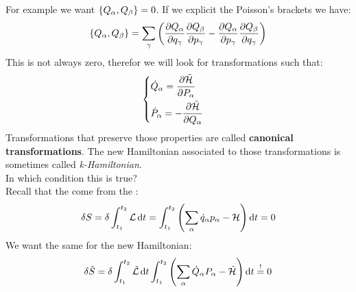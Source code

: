 For example we want $\pb{Q_{\alpha}}{Q_{\beta}} = 0$. If we explicit the Poisson's brackets we have:
\begin{equation}
    \pb{Q_{\alpha}}{Q_{\beta}} = \bigsum_{\gamma} \left(\pdv{Q_{\alpha}}{q_{\gamma}} \pdv{Q_{\beta}}{p_{\gamma}} - \pdv{Q_{\alpha}}{p_{\gamma}} \pdv{Q_{\beta}}{q_{\gamma}} \right)
\end{equation}
This is not always zero, therefor we will look for transformations such that:
\begin{equation}
    \begin{cases}
        \dot{Q}_{\alpha} = \pdv{\tilde{\hamfun}}{P_{\alpha}} \\[8pt]
        \dot{P}_{\alpha} = -\pdv{\tilde{\hamfun}}{Q_{\alpha}}
    \end{cases}
\end{equation}
Transformations that preserve those properties are called \textbf{canonical transformations}. The new Hamiltonian associated to those transformations is sometimes called \textit{k-Hamiltonian}.\\
In which condition this is true?\\
Recall that the \hamiltonref\;come from the \hpquotemath :
\begin{equation}
    \delta S = \delta \int_{t_1}^{t_2}\mathcal{L} \dd{t} = \int_{t_1}^{t_2} \left(\displaystyle\sum_{\alpha}\dot{q}_{\alpha}p_{\alpha} - \mathcal{H}\right) \dd{t} =0
\end{equation}
We want the same for the new Hamiltonian:
\begin{equation}
    \delta \tilde{S} = \delta \int_{t_1}^{t_2}\tilde{\mathcal{L}} \dd{t} \int_{t_1}^{t_2} \left(\displaystyle\sum_{\alpha}\dot{Q}_{\alpha}P_{\alpha} - \tilde{\mathcal{H}}\right) \dd{t} \overset{!}{=} 0
\end{equation}
